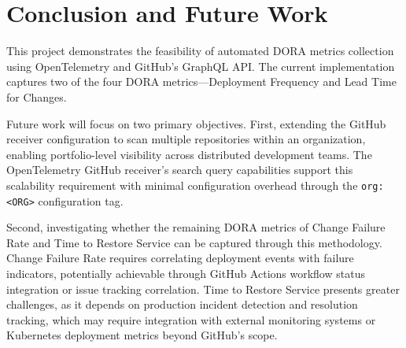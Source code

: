 \documentclass[12pt]{article}
\begin{document}
\section{Conclusion and Future Work}

This project demonstrates the feasibility of automated DORA metrics collection using
OpenTelemetry and GitHub's GraphQL API. The current implementation captures
two of the four DORA metrics—Deployment Frequency and Lead Time for Changes.


Future work will focus on two primary objectives. First, extending the GitHub receiver
configuration to scan multiple repositories within an organization, enabling portfolio-level
visibility across distributed development teams. The OpenTelemetry GitHub receiver's
search query capabilities support this scalability requirement
with minimal configuration overhead through the \texttt{org:<ORG>} configuration tag.


Second, investigating whether the remaining DORA metrics of Change Failure Rate and
Time to Restore Service can be captured through this methodology. Change Failure Rate
requires correlating deployment events with failure indicators, potentially achievable
through GitHub Actions workflow status integration or issue tracking correlation.
Time to Restore Service presents greater challenges, as it depends on production incident
detection and resolution tracking, which may require integration with external monitoring
systems or Kubernetes deployment metrics beyond GitHub's scope.




\end{document}
